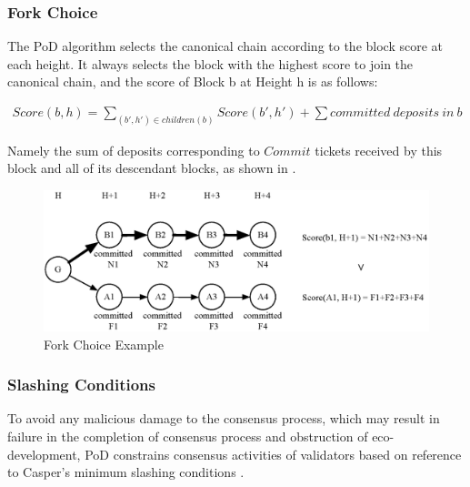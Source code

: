 \subsubsection{Fork Choice}
\label{pod:design:fork}

The PoD algorithm selects the canonical chain according to the block score at each height. It always selects the block with the highest score to join the canonical chain, and the score of Block b at Height h is as follows:


\begin{align}
Score(b, h) = \sum_{(b',h') \in children(b)}Score(b', h') + \sum committed~deposits~in~b
\end{align}
\noindent 

Namely the sum of deposits corresponding to $Commit$ tickets received by this block and all of its descendant blocks, as shown in .


\begin{figure}[h]
\centering
\includegraphics[width=12cm]{./figs/fork}
\caption{Fork Choice Example}
\label{fig:fork_choice}
\end{figure}

\subsubsection{Slashing Conditions}
\label{pod:design:vote}

To avoid any malicious damage to the consensus process, which may result in failure in the completion of consensus process and obstruction of eco-development, PoD constrains consensus activities of validators based on reference to Casper’s minimum slashing conditions \cite{minimal_slash_rules}.


